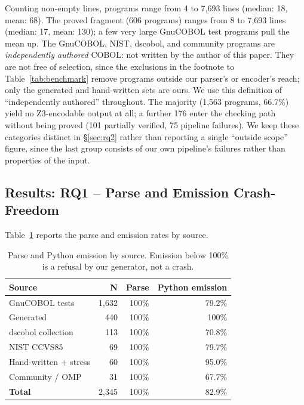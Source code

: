 \documentclass[sigconf,nonacm]{acmart}
\begin{document}
Counting non-empty lines, programs range from 4 to 7{,}693 lines (median: 18, mean: 68). The proved fragment (606 programs) ranges from 8 to 7{,}693 lines (median: 17, mean: 130); a few very large GnuCOBOL test programs pull the mean up. The GnuCOBOL, NIST, dscobol, and community programs are \emph{independently authored} COBOL: not written by the author of this paper. They are not free of selection, since the exclusions in the footnote to Table~\ref{tab:benchmark} remove programs outside our parser's or encoder's reach; only the generated and hand-written sets are ours. We use this definition of ``independently authored'' throughout. The majority (1{,}563 programs, 66.7\%) yield no Z3-encodable output at all; a further 176 enter the checking path without being proved (101 partially verified, 75 pipeline failures). We keep these categories distinct in \S\ref{sec:rq2} rather than reporting a single ``outside scope'' figure, since the last group consists of our own pipeline's failures rather than properties of the input.

\subsection{Results: RQ1 -- Parse and Emission Crash-Freedom}\label{sec:rq1}

Table~\ref{tab:rq1} reports the parse and emission rates by source.

\begin{table}[t]
\centering
\caption{Parse and Python emission by source. Emission below 100\% is a refusal by our generator, not a crash.}
\label{tab:rq1}
\small
\begin{tabular}{lrrr}
\toprule
\textbf{Source} & \textbf{N} & \textbf{Parse} & \textbf{Python emission} \\
\midrule
GnuCOBOL tests       & 1{,}632 & 100\% & 79.2\% \\
Generated            & 440    & 100\% & 100\% \\
dscobol collection   & 113    & 100\% & 70.8\% \\
NIST CCVS85          & 69     & 100\% & 79.7\% \\
Hand-written + stress & 60    & 100\% & 95.0\% \\
Community / OMP      & 31     & 100\% & 67.7\% \\
\midrule
\textbf{Total}       & 2{,}345 & 100\% & 82.9\% \\
\bottomrule
\end{tabular}
\end{table}
\end{document}

